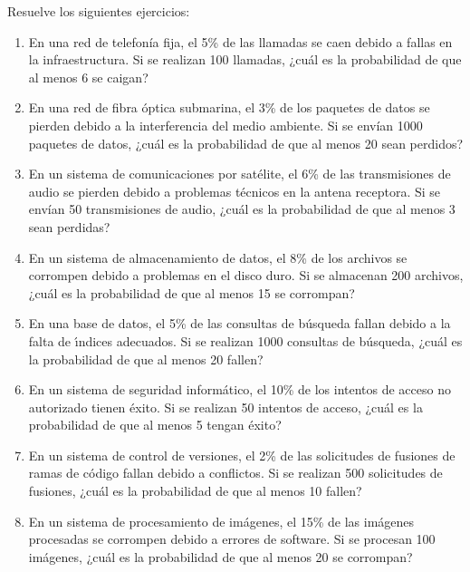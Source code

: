 \begin{Ejer}
Resuelve los siguientes ejercicios:
\begin{enumerate}

    \item En una red de telefonía fija, el 5\% de las llamadas se caen debido a fallas en la infraestructura. Si se realizan 100 llamadas, ¿cuál es la probabilidad de que al menos 6 se caigan?

    \item En una red de fibra \'optica submarina, el 3\% de los paquetes de datos se pierden debido a la interferencia del medio ambiente. Si se envían 1000 paquetes de datos, ¿cuál es la probabilidad de que al menos 20 sean perdidos?

    \item En un sistema de comunicaciones por sat\'elite, el 6\% de las transmisiones de audio se pierden debido a problemas técnicos en la antena receptora. Si se envían 50 transmisiones de audio, ¿cuál es la probabilidad de que al menos 3 sean perdidas?

    \item En un sistema de almacenamiento de datos, el 8\% de los archivos se corrompen debido a problemas en el disco duro. Si se almacenan 200 archivos, ¿cuál es la probabilidad de que al menos 15 se corrompan?

    \item En una base de datos, el 5\% de las consultas de búsqueda fallan debido a la falta de \'{\i}ndices adecuados. Si se realizan 1000 consultas de búsqueda, ¿cuál es la probabilidad de que al menos 20 fallen?

    \item En un sistema de seguridad informático, el 10\% de los intentos de acceso no autorizado tienen éxito. Si se realizan 50 intentos de acceso, ¿cuál es la probabilidad de que al menos 5 tengan éxito?

    \item En un sistema de control de versiones, el 2\% de las solicitudes de fusiones de ramas de código fallan debido a conflictos. Si se realizan 500 solicitudes de fusiones, ¿cuál es la probabilidad de que al menos 10 fallen?

    \item En un sistema de procesamiento de imágenes, el 15\% de las imágenes procesadas se corrompen debido a errores de software. Si se procesan 100 imágenes, ¿cuál es la probabilidad de que al menos 20 se corrompan?


\end{enumerate}
\end{Ejer}
